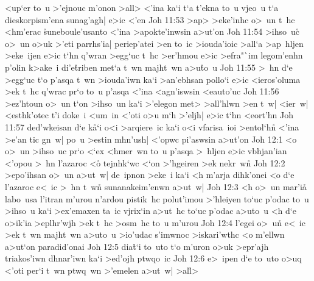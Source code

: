 <up`er
to~u
>'ejnouc
m'onon
>all>
<'ina
ka`i
t`a
t'ekna
to~u
vjeo~u
t`a
dieskorpism'ena
sunag'agh|
e>ic
<'en\bibvsend
\vs Joh 11:53
>ap>
>eke'inhc
o>~un
t~hc
<hm'erac
\r{s}uneboule'usanto
<'ina
>apokte'inwsin
a>ut'on\bibvsend
\vs Joh 11:54
>ihso~uc\r{}
o>~un
o>uk
>'eti
parrhs'ia|
periep'atei
>en
to~ic
>iouda'ioic
>all`a
>ap~hljen
>eke~ijen
e>ic
t`hn
q'wran
>egg`uc
t~hc
>er'hmou
e>ic
>efra"`im
legom'enhn
p'olin
k>ake~i
di'e\r{t}riben
met`a
t~wn
majht~wn
a>u\r{t}o~u\bibvsend
{}
\vs Joh 11:55
>~hn
d`e
>egg`uc
t`o
p'asqa
t~wn
>iouda'iwn
ka`i
>an'ebhsan
pollo`i
e>ic
<ieros'oluma
>ek
t~hc
q'wrac
pr`o
to~u
p'asqa
<'ina
<agn'iswsin
<eauto'uc\bibvsend
\vs Joh 11:56
>ez'htoun
o>~un
t`on
>ihso~un
ka`i
>'elegon
met>
>all'hlwn
>en
t~w|
<ier~w|
<esthk'otec
t'i
doke~i
<um~in
<'oti
o>u
m`h
>'eljh|
e>ic
t`hn
<eort'hn\bibvsend
\vs Joh 11:57
ded'wkeisan
d`e
k\r{a}`i
o<i
>arqiere~ic
ka`i
o<i
vfarisa~ioi
>entol`h\r{n}
<'ina
>e'an
tic
gn~w|
po~u
>estin
mhn'ush|
<'opwc
pi'aswsin
a>ut'on\bibvsend
\vs Joh 12:1
<o
o>~un
>ihso~uc
pr`o
<`ex
<hmer~wn
to~u
p'asqa
>~hljen
e>ic
vbhjan'ian
<'opou
>~hn
l'azaroc
<o\r{}
tejnhk`wc
<`on
>'hgeiren
>ek
nekr~w\r{n}\bibvsend
{}
\vs Joh 12:2
>epo'ihsan
o>~un
a>ut~w|
de~ipnon
>eke~i
ka`i
<h
m'arja
dihk'onei
<o
d`e
l'azaroc
e<~ic
>~hn
t~wn\r{}
sunanakeim'enwn
a>ut~w|\bibvsend
\vs Joh 12:3
<h
o>~un
mar'i\r{a}
labo~usa
l'itran
m'urou
n'ardou
pistik~hc
polut'imou
>'hleiyen
to`uc
p'odac
to~u
>ihso~u
ka`i
>ex'emaxen
ta~ic
vjrix`in
a>ut~hc
to`uc
p'odac
a>uto~u
<h
d`e
o>ik'ia
>eplhr'wjh
>ek
t~hc
>osm~hc
to~u
m'urou\bibvsend
\vs Joh 12:4
l'egei
o>~un\r{}
e<~ic
>ek
t~wn
majht~wn
a>uto~u
>io'udac
s'imwnoc
>iskari'wthc
<o
m'ellwn
a>ut`on
paradid'onai\bibvsend
\vs Joh 12:5
dia\r{t}`i
to~uto
t`o
m'uron
o>uk
>epr'ajh
triakos'iwn
dhnar'iwn
ka`i
>ed'ojh
ptwqo~ic\bibvsend
\vs Joh 12:6
e>~ipen
d`e
to~uto
o>uq
<'oti
per`i
t~wn
ptwq~wn
>'emelen
a>ut~w|
>al\r{l}>
